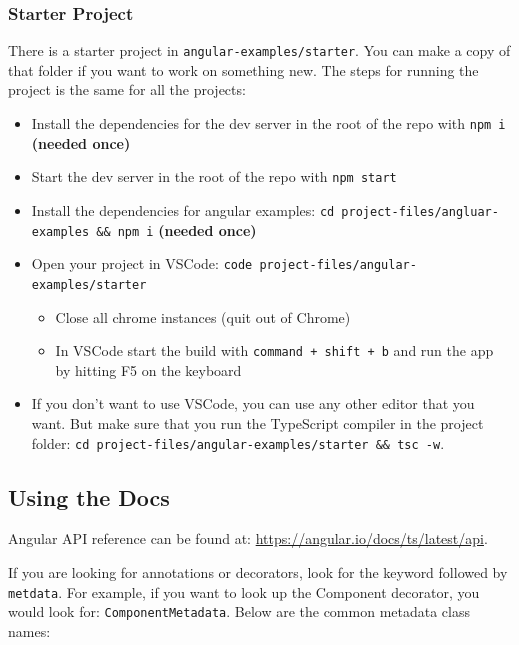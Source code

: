 \documentclass[12pt,]{article}
\providecommand{\tightlist}{%
  \setlength{\itemsep}{0pt}\setlength{\parskip}{0pt}}
\begin{document}
\subsubsection{Starter Project}\label{starter-project}

There is a starter project in \texttt{angular-examples/starter}. You can
make a copy of that folder if you want to work on something new. The
steps for running the project is the same for all the projects:

\begin{itemize}
\tightlist
\item
  Install the dependencies for the dev server in the root of the repo
  with \texttt{npm\ i} \textbf{(needed once)}
\item
  Start the dev server in the root of the repo with \texttt{npm\ start}
\item
  Install the dependencies for angular examples:
  \texttt{cd\ project-files/angluar-examples\ \&\&\ npm\ i}
  \textbf{(needed once)}
\item
  Open your project in VSCode:
  \texttt{code\ project-files/angular-examples/starter}

  \begin{itemize}
  \tightlist
  \item
    Close all chrome instances (quit out of Chrome)
  \item
    In VSCode start the build with \texttt{command\ +\ shift\ +\ b} and
    run the app by hitting F5 on the keyboard
  \end{itemize}
\item
  If you don't want to use VSCode, you can use any other editor that you
  want. But make sure that you run the TypeScript compiler in the
  project folder:
  \texttt{cd\ project-files/angular-examples/starter\ \&\&\ tsc\ -w}.
\end{itemize}

\subsection{Using the Docs}\label{using-the-docs}

Angular API reference can be found at:
\url{https://angular.io/docs/ts/latest/api}.

If you are looking for annotations or decorators, look for the keyword
followed by \texttt{metdata}. For example, if you want to look up the
Component decorator, you would look for: \texttt{ComponentMetadata}.
Below are the common metadata class names:
\end{document}
